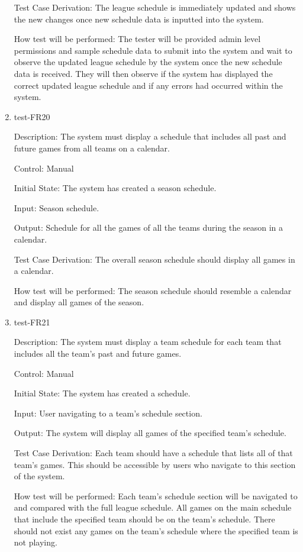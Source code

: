 \documentclass[12pt, titlepage]{article}
\begin{document}
\begin{enumerate}
  Test Case Derivation: The league schedule is immediately updated and shows the new changes
  once new schedule data is inputted into the system.

  How test will be performed: The tester will be provided admin level permissions and sample
  schedule data to submit into the system and wait to observe the updated league schedule
  by the system once the new schedule data is received. They will then observe if the
  system has displayed the correct updated league schedule and if any errors had
  occurred within the system.

  \item{test-FR20\\}
  
  Description: The system must display a schedule that includes
  all past and future games from all teams on a calendar.

  Control: Manual

  Initial State: The system has created a season schedule.

  Input: Season schedule.

  Output: Schedule for all the games of all the teams during the season in a calendar. 

  Test Case Derivation: The overall season schedule should display all games in a calendar.

  How test will be performed: The season schedule should resemble a calendar and display all games of the season.

  \item{test-FR21\\}
  
  Description: The system must display a team schedule for each
  team that includes all the team’s past and future games.

  Control: Manual

  Initial State: The system has created a schedule.

  Input: User navigating to a team's schedule section.

  Output: The system will display all games of the specified team's schedule.

  Test Case Derivation: Each team should have a schedule that lists all of
  that team's games. This should be accessible by users who navigate to this
  section of the system.

  How test will be performed: Each team's schedule section will be navigated to
  and compared with the full league schedule. All games on the main schedule
  that include the specified team should be on the team's schedule. There should
  not exist any games on the team's schedule where the specified team is not
  playing.


\end{enumerate}
\end{document}
